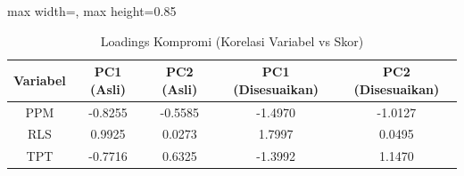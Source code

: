 \begin{table}[H]
\centering
\caption{Loadings Kompromi (Korelasi Variabel vs Skor)} \label{tab:sampleloadings}
\begin{adjustbox}{max width=\textwidth, max height=0.85\textheight}
\begin{tabular}{|c|c|c|c|c|}
\hline
\textbf{Variabel} & \textbf{PC1 (Asli)} & \textbf{PC2 (Asli)} & \textbf{PC1 (Disesuaikan)} & \textbf{PC2 (Disesuaikan)} \\
\hline
PPM & -0.8255 & -0.5585 & -1.4970 & -1.0127 \\
RLS & 0.9925 & 0.0273 & 1.7997 & 0.0495 \\
TPT & -0.7716 & 0.6325 & -1.3992 & 1.1470 \\
\hline
\end{tabular}
\end{adjustbox}
\end{table}